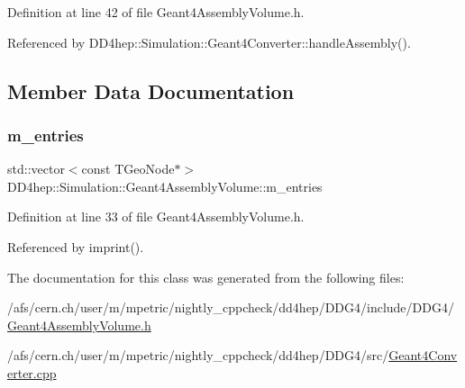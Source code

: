 Definition at line 42 of file Geant4\+Assembly\+Volume.\+h.



Referenced by D\+D4hep\+::\+Simulation\+::\+Geant4\+Converter\+::handle\+Assembly().



\subsection{Member Data Documentation}
\hypertarget{class_d_d4hep_1_1_simulation_1_1_geant4_assembly_volume_a0d910d90aa651bf5ccb3816c5ce3641a}{}\label{class_d_d4hep_1_1_simulation_1_1_geant4_assembly_volume_a0d910d90aa651bf5ccb3816c5ce3641a} 
\subsubsection{\texorpdfstring{m\+\_\+entries}{m\_entries}}
{\footnotesize\ttfamily std\+::vector$<$const T\+Geo\+Node$\ast$$>$ D\+D4hep\+::\+Simulation\+::\+Geant4\+Assembly\+Volume\+::m\+\_\+entries}



Definition at line 33 of file Geant4\+Assembly\+Volume.\+h.



Referenced by imprint().



The documentation for this class was generated from the following files\+:\begin{DoxyCompactItemize}
\item 
/afs/cern.\+ch/user/m/mpetric/nightly\+\_\+cppcheck/dd4hep/\+D\+D\+G4/include/\+D\+D\+G4/\hyperlink{_geant4_assembly_volume_8h}{Geant4\+Assembly\+Volume.\+h}\item 
/afs/cern.\+ch/user/m/mpetric/nightly\+\_\+cppcheck/dd4hep/\+D\+D\+G4/src/\hyperlink{_geant4_converter_8cpp}{Geant4\+Converter.\+cpp}\end{DoxyCompactItemize}
